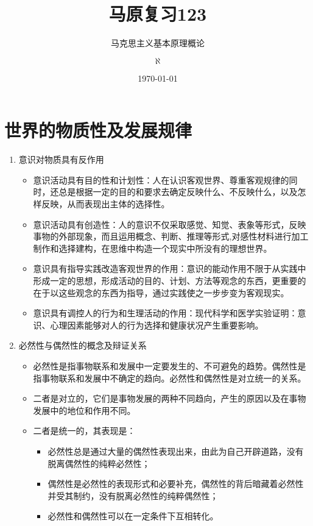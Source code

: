 \documentclass[device=pad,lang=cn,UTF8]{elegantbook}
\title{马原复习123}
\subtitle{马克思主义基本原理概论}
\author{$\aleph$}
\institute{Jiang Xi Science and Technology University}
\date{\today}
\begin{document}
    \maketitle
    \tableofcontents
    \mainmatter
    \hypersetup{pageanchor=true}
    \chapter{世界的物质性及发展规律}
    \begin{enumerate}
        \item 意识对物质具有反作用
        \begin{itemize}
            \item 意识活动具有目的性和计划性：人在认识客观世界、尊重客观规律的同时，还总是根据一定的目的和要求去确定反映什么、不反映什么，以及怎样反映，从而表现出主体的选择性。
            \item 意识活动具有创造性：人的意识不仅采取感觉、知觉、表象等形式，反映事物的外部现象，而且运用概念、判断、推理等形式,对感性材料进行加工制作和选择建构，在思维中构造一个现实中所没有的理想世界。
            \item 意识具有指导实践改造客观世界的作用：意识的能动作用不限于从实践中形成一定的思想，形成活动的目的、计划、方法等观念的东西，更重要的在于以这些观念的东西为指导，通过实践使之一步步变为客观现实。
            \item 意识具有调控人的行为和生理活动的作用：现代科学和医学实验证明：意识、心理因素能够对人的行为选择和健康状况产生重要影响。
        \end{itemize}
        \item 必然性与偶然性的概念及辩证关系
        \begin{itemize}
            \item 必然性是指事物联系和发展中一定要发生的、不可避免的趋势。偶然性是指事物联系和发展中不确定的趋向。必然性和偶然性是对立统一的关系。
            \item 二者是对立的，它们是事物发展的两种不同趋向，产生的原因以及在事物发展中的地位和作用不同。
            \item 二者是统一的，其表现是：
            \begin{itemize}
                \item 必然性总是通过大量的偶然性表现出来，由此为自己开辟道路，没有脱离偶然性的纯粹必然性；
                \item 偶然性是必然性的表现形式和必要补充，偶然性的背后暗藏着必然性并受其制约，没有脱离必然性的纯粹偶然性；
                \item 必然性和偶然性可以在一定条件下互相转化。

\end{itemize}
\end{itemize}
\end{enumerate}
\end{document}
